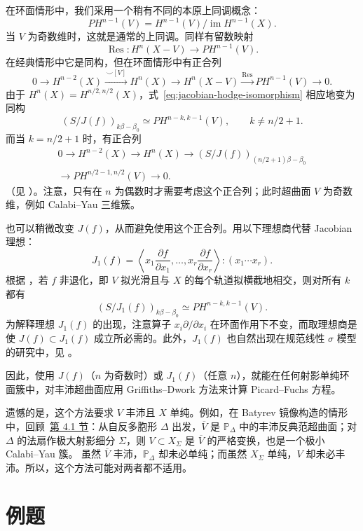 在环面情形中，我们采用一个稍有不同的本原上同调概念：
\[
PH^{n-1}(V)=H^{n-1}(V)\big/\operatorname{im}H^{n-1}(X).
\]
当 $V$ 为奇数维时，这就是通常的上同调。同样有留数映射
\[
\operatorname{Res}:H^n(X-V)\longrightarrow PH^{n-1}(V).
\]
在经典情形中它是同构，但在环面情形中有正合列
\[
0\longrightarrow H^{n-2}(X)\xrightarrow{\,\smile[V]\,}H^n(X)
\longrightarrow H^n(X-V)\xrightarrow{\operatorname{Res}}
PH^{n-1}(V)\longrightarrow0.
\]
由于 $H^n(X)=H^{n/2,n/2}(X)$，式~\eqref{eq:jacobian-hodge-isomorphism} 相应地变为同构
\[
(S/J(f))_{k\beta-\beta_0}\simeq PH^{n-k,k-1}(V),
\qquad k\ne n/2+1.
\]
而当 $k=n/2+1$ 时，有正合列
\[
\begin{split}
0\longrightarrow H^{n-2}(X)\longrightarrow H^n(X)
\longrightarrow (S/J(f))_{(n/2+1)\beta-\beta_0}\\
\longrightarrow PH^{n/2-1,n/2}(V)\longrightarrow0.
\end{split}
\]
（见 ）。注意，只有在 $n$ 为偶数时才需要考虑这个正合列；此时超曲面 $V$ 为奇数维，例如 Calabi--Yau 三维簇。

也可以稍微改变 $J(f)$，从而避免使用这个正合列。用以下理想商代替 Jacobian 理想：
\[
J_1(f)=\left\langle x_1\frac{\partial f}{\partial x_1},\ldots,
x_r\frac{\partial f}{\partial x_r}\right\rangle:(x_1\cdots x_r).
\]
根据 ，若 $f$ 非退化，即 $V$ 拟光滑且与 $X$ 的每个轨道拟横截地相交，则对所有 $k$ 都有
\[
(S/J_1(f))_{k\beta-\beta_0}\simeq PH^{n-k,k-1}(V).
\]
为解释理想 $J_1(f)$ 的出现，注意算子 $x_i\partial/\partial x_i$ 在环面作用下不变，而取理想商是使 $J(f)\subset J_1(f)$ 成立所必需的。此外，$J_1(f)$ 也自然出现在规范线性 $\sigma$ 模型的研究中，见 。

因此，使用 $J(f)$（$n$ 为奇数时）或 $J_1(f)$（任意 $n$），就能在任何射影单纯环面簇中，对丰沛超曲面应用 Griffiths--Dwork 方法来计算 Picard--Fuchs 方程。

遗憾的是，这个方法要求 $V$ 丰沛且 $X$ 单纯。例如，在 Batyrev 镜像构造的情形中，回顾~\hyperref[sec:batyrev-mirror]{第 4.1 节}：从自反多胞形 $\Delta$ 出发，$\overline V$ 是 $\mathbb P_\Delta$ 中的丰沛反典范超曲面；对 $\Delta$ 的法扇作极大射影细分 $\Sigma$，则 $V\subset X_\Sigma$ 是 $\overline V$ 的严格变换，也是一个极小 Calabi--Yau 簇。
虽然 $\overline V$ 丰沛，$\mathbb P_\Delta$ 却未必单纯；而虽然 $X_\Sigma$ 单纯，$V$ 却未必丰沛。所以，这个方法可能对两者都不适用。

\section{例题}\label{sec:hodge-examples}

